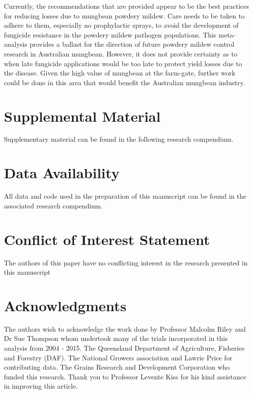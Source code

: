 \documentclass[agronomy,article,submit,moreauthors,pdftex]{mdpi}
\begin{document}
Currently, the recommendations that are provided appear to be the best practices for reducing losses due to mungbean powdery mildew.
Care needs to be taken to adhere to them, especially no prophylactic sprays, to avoid the development of fungicide resistance in the powdery mildew pathogen populations.
This meta-analysis provides a ballast for the direction of future powdery mildew control research in Australian mungbean.
However, it does not provide certainty as to when late fungicide applications would be too late to protect yield losses due to the disease.
Given the high value of mungbean at the farm-gate, further work could be done in this area that would benefit the Australian mungbean industry.

\hypertarget{supplemental-material}{%
\section{Supplemental Material}\label{supplemental-material}}

Supplementary material can be found in the following research compendium.

\hypertarget{data-availability}{%
\section{Data Availability}\label{data-availability}}

All data and code used in the preparation of this manuscript can be found in the associated research compendium.

\hypertarget{conflict-of-interest-statement}{%
\section{Conflict of Interest Statement}\label{conflict-of-interest-statement}}

The authors of this paper have no conflicting interest in the research presented in this manuscript

\hypertarget{acknowledgments}{%
\section{Acknowledgments}\label{acknowledgments}}

The authors wish to acknowledge the work done by Professor Malcolm Riley and Dr Sue Thompson whom undertook many of the trials incorporated in this analysis from 2004 - 2015.
The Queensland Department of Agriculture, Fisheries and Forestry (DAF).
The National Growers association and Lawrie Price for contributing data.
The Grains Research and Development Corporation who funded this research.
Thank you to Professor Levente Kiss for his kind assistance in improving this article.
\end{document}
